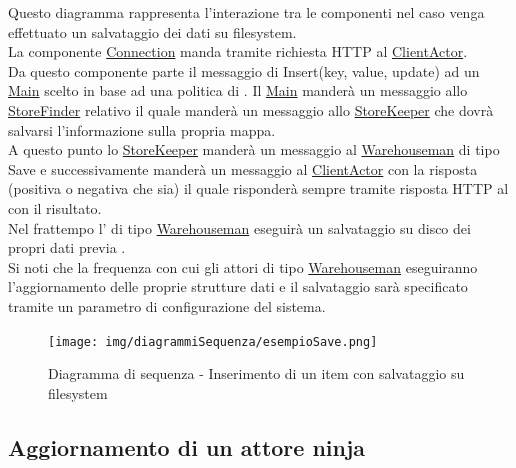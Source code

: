 \documentclass{scalatekids-article}
\begin{document}
Questo diagramma rappresenta l'interazione tra le componenti nel caso venga
effettuato un salvataggio dei dati su filesystem.\\
La componente \hyperref[sec:actorbase::driver::client::Connection]{Connection}
manda tramite richiesta HTTP al \hyperref[sec:actorbase::actorsystem::clientactor::ClientActor]{ClientActor}.\\
Da questo componente parte il messaggio di Insert(key, value, update) ad un \hyperref[sec:actorbase::actorsystem::main::Main]{Main} scelto in base ad una
politica di . Il \hyperref[sec:actorbase::actorsystem::main::Main]{Main} manderà un messaggio allo
\hyperref[sec:actorbase::actorsystem::storefinder::StoreFinder]{StoreFinder} relativo il quale manderà un messaggio
allo \hyperref[sec:actorbase::actorsystem::storekeeper::StoreKeeper]{StoreKeeper} che dovrà salvarsi l'informazione sulla propria mappa.\\
A questo punto lo \hyperref[sec:actorbase::actorsystem::storekeeper::StoreKeeper]{StoreKeeper} manderà un messaggio al
\hyperref[sec:actorbase::actorsystem::warehouseman::Warehouseman]{Warehouseman} di tipo Save e
successivamente manderà un messaggio al \hyperref[sec:actorbase::actorsystem::clientactor::ClientActor]{ClientActor} con la risposta
(positiva o negativa che sia) il quale risponderà sempre tramite risposta HTTP al  con il risultato.\\
Nel frattempo l' di tipo \hyperref[sec:actorbase::actorsystem::warehouseman::Warehouseman]{Warehouseman} eseguirà un salvataggio
su disco dei propri dati previa .\\
Si noti che la frequenza con cui gli attori di tipo \hyperref[sec:actorbase::actorsystem::warehouseman::Warehouseman]{Warehouseman} eseguiranno
l'aggiornamento delle proprie strutture dati e il salvataggio sarà specificato
tramite un parametro di configurazione del sistema.\\
\begin{figure}[H]
  \begin{center}
    \texttt{[image: img/diagrammiSequenza/esempioSave.png]}
    \caption{Diagramma di sequenza - Inserimento di un item con salvataggio su filesystem}
  \end{center}
\end{figure}

\subsection{Aggiornamento di un attore ninja}
\end{document}
